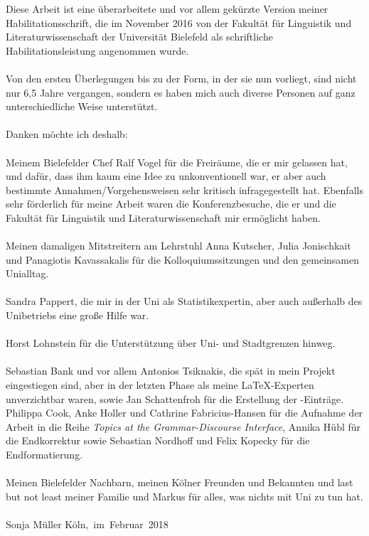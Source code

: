 \begin{refsection}

Diese Arbeit ist eine überarbeitete und vor allem gekürzte Version meiner Habilitationsschrift, die im November 2016 von der Fakultät für Linguistik und Literaturwissenschaft der Universität Bielefeld als schriftliche Habilitationsleistung angenommen wurde.\\
\noindent
\\ Von den ersten Überlegungen bis zu der Form, in der sie nun vorliegt, sind nicht nur 6,5 Jahre vergangen, sondern es haben mich auch diverse Personen auf ganz unterschiedliche Weise unterstützt.\\
\noindent
\\ Danken möchte ich deshalb:\\
\noindent
\\ Meinem Bielefelder Chef Ralf Vogel für die Freiräume, die er mir gelassen hat, und dafür, dass ihm kaum eine Idee zu unkonventionell war, er aber auch bestimmte Annahmen/Vorgehensweisen sehr kritisch infragegestellt hat. Ebenfalls sehr förderlich für meine Arbeit waren die Konferenzbesuche, die er und die Fakultät für Linguistik und Literaturwissenschaft mir ermöglicht haben.\\
\noindent
\\ Meinen damaligen Mitstreitern am Lehrstuhl Anna Kutscher, Julia Jonischkait und Panagiotis Kavassakalis für die Kolloquiumssitzungen und den gemeinsamen Unialltag.\\
\noindent
\\ Sandra Pappert, die mir in der Uni als Statistikexpertin, aber auch außerhalb des Unibetriebs eine große Hilfe war.\\
\noindent
\\ Horst Lohnstein für die Unterstützung über Uni- und Stadtgrenzen hinweg.\\
\noindent
\\ Sebastian Bank und vor allem Antonios Tsiknakis, die spät in mein Projekt eingestiegen sind, aber in der letzten Phase als meine \LaTeX-Experten unverzichtbar waren, sowie Jan Schattenfroh für die Erstellung der \BibTeX-Einträge.
\pagebreak
\noindent
\\Philippa Cook, Anke Holler und Cathrine Fabricius-Hansen für die Aufnahme der Arbeit in die Reihe \textit{Topics at the Grammar-Discourse Interface}, Annika Hübl für die Endkorrektur sowie Sebastian Nordhoff und Felix Kopecky für die Endformatierung.\\
\noindent
\\ Meinen Bielefelder Nachbarn, meinen Kölner Freunden und Bekannten und last but not least meiner Familie und Markus für alles, was nichts mit Uni zu tun hat.\\\\
\noindent
Sonja Müller
\hfill\hbox{Köln, im Februar 2018}





\printbibliography[heading=subbibliography]
\end{refsection}

